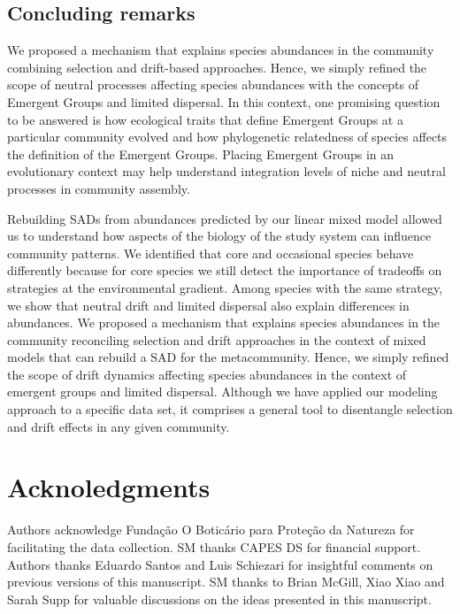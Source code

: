 \documentclass[12pt]{article}
\begin{document}
\subsection*{Concluding remarks}

We proposed a mechanism that explains species abundances in the community combining selection and drift-based approaches. Hence, we simply refined the scope of neutral processes affecting species abundances with the concepts of Emergent Groups and limited dispersal. In this context, one promising question to be answered is how ecological traits that define Emergent Groups at a particular community
evolved and how phylogenetic relatedness of species affects the definition of the Emergent Groups. Placing Emergent Groups in an evolutionary context may help understand integration levels of niche
and neutral processes in community assembly.

Rebuilding SADs from abundances predicted by our linear mixed model allowed us to understand how aspects of the biology of the study system can influence community patterns. We identified that core and occasional species behave differently because for core species we still detect the importance of tradeoffs on strategies at the environmental gradient. Among species with the same strategy, we show that
neutral drift and limited dispersal also explain differences in abundances. 
We proposed a mechanism that explains species abundances in the community reconciling selection and drift approaches in the context of mixed models that can rebuild a SAD for the metacommunity. Hence, we simply refined the scope of drift dynamics affecting species abundances in the context of emergent groups and limited dispersal. Although we have applied our modeling approach to a specific data set, it comprises a general tool to disentangle selection and drift effects in any given community. 



\section*{Acknoledgments} 
Authors acknowledge Fundação O Boticário para Proteção da Natureza for facilitating the data collection. SM thanks CAPES DS for financial support. Authors thanks Eduardo Santos and Luis Schiezari for insightful comments on previous versions of this manuscript. SM thanks to Brian McGill, Xiao Xiao and Sarah Supp for valuable discussions on the ideas presented in this manuscript.
\end{document}
